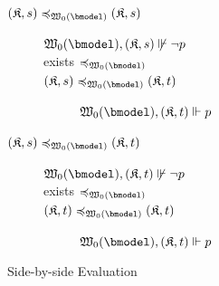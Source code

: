 \begin{example}
\begin{figure}
\begin{center}
{{\begin{minipage}[t]{.55\textwidth}
\begin{description}
\begin{description}
\begin{description}
                                \item[${\pair \kmodel s} \Fof{\wmofbm0} {\pair \kmodel s}$]\hfil
                                \begin{description}
                                        \item[$\nxforces {\wmofbm0} {\pair \kmodel s} {\lnot p}$]
                                        \item[exists $\Fof{\wmofbm0}$]
                                        \item[${\pair \kmodel s} \Fof{\wmofbm0} {\pair \kmodel t}$]\hfil
                                        \item[\quad] $\xforces {\wmofbm0} {\pair \kmodel t} p$
                                \end{description}

                                \item[${\pair \kmodel s} \Fof{\wmofbm0} {\pair \kmodel t}$]\hfil
                                \begin{description}
                                        \item[$\nxforces {\wmofbm0} {\pair \kmodel t} {\lnot p}$]
                                        \item[exists $\Fof{\wmofbm0}$]
                                        \item[${\pair \kmodel t} \Fof{\wmofbm0} {\pair \kmodel t}$]\hfil
                                        \item[\quad] $\xforces {\wmofbm0} {\pair \kmodel t} p$
                                \end{description}
                                \end{description}
                        \end{description}
                        \end{description}
                \end{minipage}}
                }
                \end{center}
                \caption{Side-by-side Evaluation}\label{fig:eval}
        \end{figure}
\end{example}
